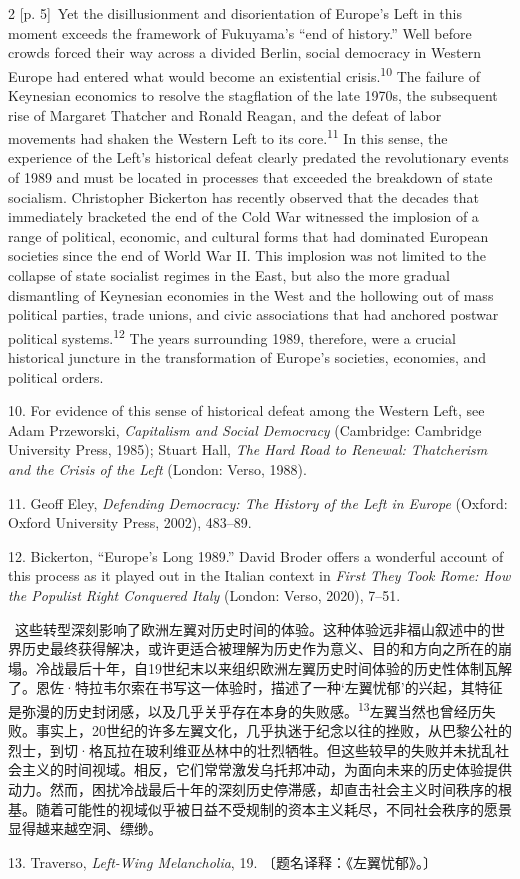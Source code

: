 \documentclass[10pt,a4paper]{article}
\begin{document}
\begin{paracol}{2}
{\scriptsize\color{gray} [p. 5]}\ Yet the disillusionment and disorientation of Europe’s Left in this moment exceeds the framework of Fukuyama’s “end of history.” Well before crowds forced their way across a divided Berlin, social democracy in Western Europe had entered what would become an existential crisis.\nobreak\textsuperscript{10} The failure of Keynesian economics to resolve the stagflation of the late 1970s, the subsequent rise of Margaret Thatcher and Ronald Reagan, and the defeat of labor movements had shaken the Western Left to its core.\nobreak\textsuperscript{11} In this sense, the experience of the Left’s historical defeat clearly predated the revolutionary events of 1989 and must be located in processes that exceeded the breakdown of state socialism. Christopher Bickerton has recently observed that the decades that immediately bracketed the end of the Cold War witnessed the implosion of a range of political, economic, and cultural forms that had dominated European societies since the end of World War II. This implosion was not limited to the collapse of state socialist regimes in the East, but also the more gradual dismantling of Keynesian economies in the West and the hollowing out of mass political parties, trade unions, and civic associations that had anchored postwar political systems.\nobreak\textsuperscript{12} The years surrounding 1989, therefore, were a crucial historical juncture in the transformation of Europe’s societies, economies, and political orders.\par{\small 10. For evidence of this sense of historical defeat among the Western Left, see Adam Przeworski, \textit{Capitalism and Social Democracy} (Cambridge: Cambridge University Press, 1985); Stuart Hall, \textit{The Hard Road to Renewal: Thatcherism and the Crisis of the Left} (London: Verso, 1988).\par}{\small 11. Geoff Eley, \textit{Defending Democracy: The History of the Left in Europe} (Oxford: Oxford University Press, 2002), 483–89.\par}{\small 12. Bickerton, “Europe’s Long 1989.” David Broder offers a wonderful account of this process as it played out in the Italian context in \textit{First They Took Rome: How the Populist Right Conquered Italy} (London: Verso, 2020), 7–51.\par}
\switchcolumn*
{\scriptsize\color{gray} [p. 6]}\ 这些转型深刻影响了欧洲左翼对历史时间的体验。这种体验远非福山叙述中的世界历史最终获得解决，或许更适合被理解为历史作为意义、目的和方向之所在的崩塌。冷战最后十年，自19世纪末以来组织欧洲左翼历史时间体验的历史性体制瓦解了。恩佐·特拉韦尔索在书写这一体验时，描述了一种‘左翼忧郁’的兴起，其特征是弥漫的历史封闭感，以及几乎关乎存在本身的失败\mbox{感。\textsuperscript{13}}左翼当然也曾经历失败。事实上，20世纪的许多左翼文化，几乎执迷于纪念以往的挫败，从巴黎公社的烈士，到切·格瓦拉在玻利维亚丛林中的壮烈牺牲。但这些较早的失败并未扰乱社会主义的时间视域。相反，它们常常激发乌托邦冲动，为面向未来的历史体验提供动力。然而，困扰冷战最后十年的深刻历史停滞感，却直击社会主义时间秩序的根基。随着可能性的视域似乎被日益不受规制的资本主义耗尽，不同社会秩序的愿景显得越来越空洞、缥缈。\par{\small 13. Traverso, \textit{Left-Wing Melancholia}, 19. 〔题名译释：《左翼忧郁》。〕\par}

\end{paracol}
\end{document}
